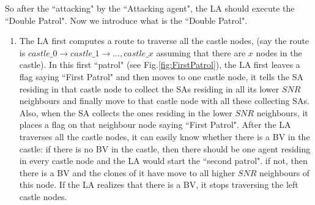 So after the ``attacking" by the ``Attacking agent", the LA should execute the ``Double Patrol". Now we introduce what is the ``Double Patrol".
\begin{enumerate}
\item 
The LA first computes a route to traverse all the castle nodes, (say the route is $castle\_0\rightarrow castle\_1 \rightarrow\ldots, castle\_x$ assuming that there are $x$ nodes in the castle). In this first ``patrol" (see Fig.\ref{fig:FirstPatrol}), the LA first leaves a flag saying ``First Patrol" and then moves to one castle node, it tells the SA residing in that castle node to collect the SAs residing in all its lower $SNR$ neighbours and finally move to that castle node with all these collecting SAs. Also, when the SA collects the ones residing in the lower $SNR$ neighbours, it places a flag on that neighbour node saying ``First Patrol". After the LA traverses all the castle nodes, it can easily know whether there is a BV in the castle: if there is no BV in the castle, then there should be one agent residing in every castle node and the LA would start the ``second patrol". if not, then there is a BV and the clones of it have move to all higher $SNR$ neighbours of this node. If the LA realizes that there is a BV, it stops traversing the left castle nodes.\\ 


\end{enumerate}
